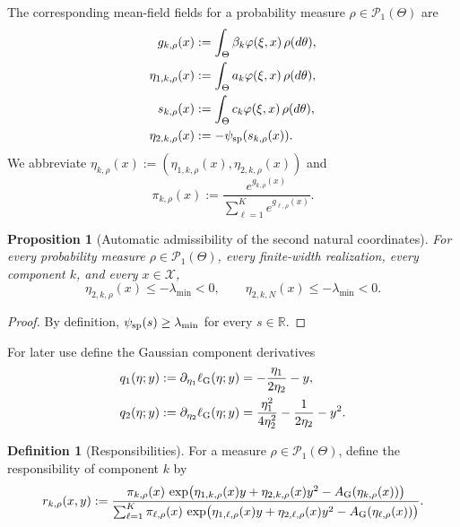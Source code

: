 \documentclass[11pt]{article}
\newtheorem{proposition}[theorem]{Proposition}
\theoremstyle{definition}
\newtheorem{definition}[theorem]{Definition}
\newcommand{\R}{\mathbb{R}}
\newcommand{\mc}[1]{\mathcal{#1}}
\newcommand{\Pone}{\mathcal{P}_1}
\begin{document}
The corresponding mean-field fields for a probability measure
$\rho\in \Pone(\Theta)$ are
\begin{align}
  g_{k,\rho}(x)
  &:=
  \int_\Theta \beta_k \varphi(\xi,x)\,\rho(d\theta),
  \\
  \eta_{1,k,\rho}(x)
  &:=
  \int_\Theta a_k \varphi(\xi,x)\,\rho(d\theta),
  \\
  s_{k,\rho}(x)
  &:=
  \int_\Theta c_k \varphi(\xi,x)\,\rho(d\theta),
  \\
  \eta_{2,k,\rho}(x)
  &:=
  -\psi_{\rm sp}(s_{k,\rho}(x)).
\end{align}
We abbreviate $\eta_{k,\rho}(x):=(\eta_{1,k,\rho}(x),\eta_{2,k,\rho}(x))$ and
\[
  \pi_{k,\rho}(x)
  :=
  \frac{e^{g_{k,\rho}(x)}}{\sum_{\ell=1}^K e^{g_{\ell,\rho}(x)}}.
\]

\begin{proposition}[Automatic admissibility of the second natural coordinates]
\label{prop:mdn-domain}
For every probability measure $\rho\in \Pone(\Theta)$, every finite-width
realization, every component $k$, and every $x\in \mc{X}$,
\[
  \eta_{2,k,\rho}(x)\le -\lambda_{\min}<0,
  \qquad
  \eta_{2,k,N}(x)\le -\lambda_{\min}<0.
\]
\end{proposition}

\begin{proof}
By definition, $\psi_{\rm sp}(s)\ge \lambda_{\min}$ for every $s\in\R$.
\end{proof}

For later use define the Gaussian component derivatives
\begin{align}
  q_1(\eta;y)
  &:=
  \partial_{\eta_1}\ell_{\rm G}(\eta;y)
  =
  -\frac{\eta_1}{2\eta_2}-y,
  \\
  q_2(\eta;y)
  &:=
  \partial_{\eta_2}\ell_{\rm G}(\eta;y)
  =
  \frac{\eta_1^2}{4\eta_2^2}
  -
  \frac{1}{2\eta_2}
  -
  y^2.
\end{align}

\begin{definition}[Responsibilities]
For a measure $\rho\in \Pone(\Theta)$, define the responsibility of component
$k$ by
\begin{equation}
  r_{k,\rho}(x,y)
  :=
  \frac{
    \pi_{k,\rho}(x)\,
    \exp\!\big(\eta_{1,k,\rho}(x)y+\eta_{2,k,\rho}(x)y^2
    -A_{\rm G}(\eta_{k,\rho}(x))\big)
  }{
    \sum_{\ell=1}^K
    \pi_{\ell,\rho}(x)\,
    \exp\!\big(\eta_{1,\ell,\rho}(x)y+\eta_{2,\ell,\rho}(x)y^2
    -A_{\rm G}(\eta_{\ell,\rho}(x))\big)
  }.
  \label{eq:responsibility}
\end{equation}
\end{definition}
\end{document}
